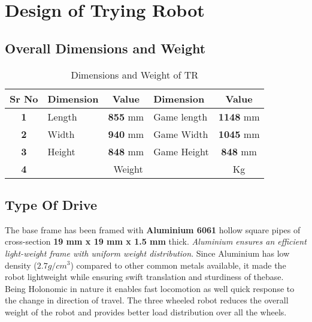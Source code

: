 \section{Design of Trying Robot}
    \subsection{Overall Dimensions and Weight}
        \begin{table}[h]
            \caption{Dimensions and Weight of TR} \label{Dimensiona_TR} \small
            \begin{tabular}{|c|l|c|l|c|}
                \hline
                \textbf{Sr No}  & \textbf{Dimension} & \textbf{Value}  & \textbf{Dimension}      & \textbf{Value}   \\ \hline
                \textbf{1}      & Length             & \textbf{855} mm & Game length             & \textbf{1148} mm \\ \hline
                \textbf{2}      & Width              & \textbf{940} mm & Game Width              & \textbf{1045} mm \\ \hline
                \textbf{3}      & Height             & \textbf{848} mm & Game Height             & \textbf{848} mm  \\ \hline
                \textbf{4}      & \multicolumn{3}{c|}{Weight}                                    & \textbf{} Kg     \\ \hline
            \end{tabular}
        \end{table}

    \subsection{Type Of Drive}
        The base frame has been framed with \textbf{Aluminium 6061} hollow square pipes of cross-section \textbf{19 mm x 19 mm x 1.5 mm} thick. 
        \textit{Aluminium ensures an efficient light-weight frame with uniform weight distribution}. Since Aluminium has low density ($2.7 g/cm^3$) compared 
        to other common metals available, it made the robot lightweight while ensuring swift translation and sturdiness of thebase. Being Holonomic 
        in nature it enables fast locomotion as well quick response to the change in direction of travel. The three wheeled robot reduces the 
        overall weight of the robot and provides better load distribution over all the wheels.

